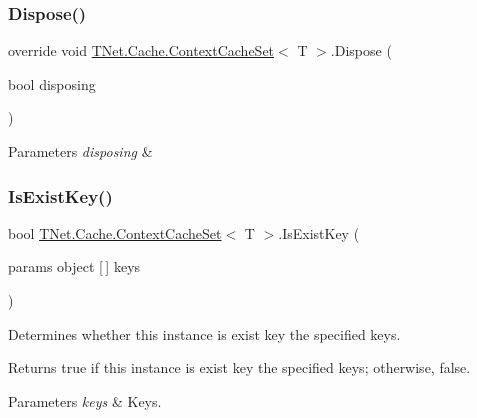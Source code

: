 \subsubsection{\texorpdfstring{Dispose()}{Dispose()}}
{\footnotesize\ttfamily override void \mbox{\hyperlink{class_t_net_1_1_cache_1_1_context_cache_set}{T\+Net.\+Cache.\+Context\+Cache\+Set}}$<$ T $>$.Dispose (\begin{DoxyParamCaption}\item[{bool}]{disposing }\end{DoxyParamCaption})\hspace{0.3cm}{\ttfamily [protected]}}






\begin{DoxyParams}{Parameters}
{\em disposing} & \\
\hline
\end{DoxyParams}
\mbox{\label{class_t_net_1_1_cache_1_1_context_cache_set_a7e2120dd078e618bae90e7a4b1bdb843}} 
\subsubsection{\texorpdfstring{Is\+Exist\+Key()}{IsExistKey()}}
{\footnotesize\ttfamily bool \mbox{\hyperlink{class_t_net_1_1_cache_1_1_context_cache_set}{T\+Net.\+Cache.\+Context\+Cache\+Set}}$<$ T $>$.Is\+Exist\+Key (\begin{DoxyParamCaption}\item[{params object \mbox{[}$\,$\mbox{]}}]{keys }\end{DoxyParamCaption})}



Determines whether this instance is exist key the specified keys. 

\begin{DoxyReturn}{Returns}
{\ttfamily true} if this instance is exist key the specified keys; otherwise, {\ttfamily false}.
\end{DoxyReturn}

\begin{DoxyParams}{Parameters}
{\em keys} & Keys.\\
\hline
\end{DoxyParams}
\mbox{\label{class_t_net_1_1_cache_1_1_context_cache_set_a73064062ddacda640d8103764b523412}} 
